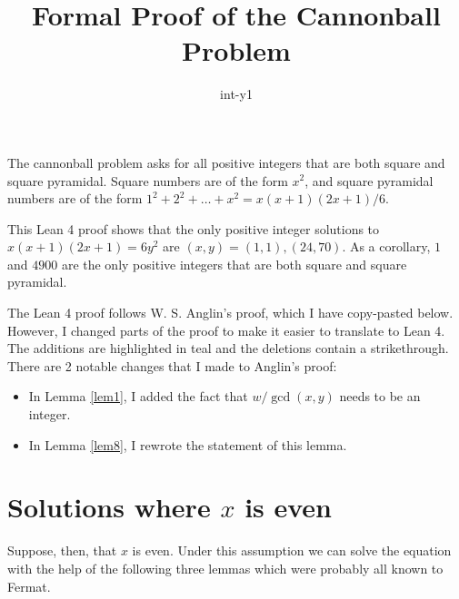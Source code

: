 \documentclass{article}
\title{Formal Proof of the Cannonball Problem}
\author{int-y1}
\numberwithin{lemma}{section}
\newcommand{\changed}[1]{{\color{teal} #1}}
\begin{document}
\maketitle

The cannonball problem asks for all positive integers that are both square and square pyramidal.
Square numbers are of the form $x^2$, and square pyramidal numbers are of the form
$1^2 + 2^2 + \dots + x^2 = x(x+1)(2x+1)/6$.

This Lean 4 proof shows that the only positive integer solutions to $x(x+1)(2x+1) = 6y^2$ are
$(x, y) = (1, 1), (24, 70)$. As a corollary, $1$ and $4900$ are the only positive integers that are both
square and square pyramidal.

The Lean 4 proof follows W. S. Anglin's proof, which I have copy-pasted below. However, I changed parts of the proof to make it easier to translate to Lean 4. The additions are highlighted in \changed{teal} and the deletions contain a strikethrough. There are 2 notable changes that I made to Anglin's proof:
\begin{itemize}
\item In Lemma \ref{lem1}, I added the fact that $w/\gcd(x,y)$ needs to be an integer.
\item In Lemma \ref{lem8}, I rewrote the statement of this lemma.
\end{itemize}

\section{Solutions where $x$ is even}

Suppose, then, that $x$ is even. Under this assumption we can solve the equation with
the help of the following three lemmas which were probably all known to Fermat.
\end{document}
